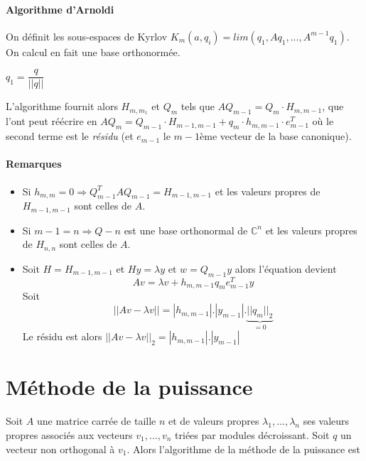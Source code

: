 \documentclass{article}
\begin{document}
\paragraph{Algorithme d'Arnoldi}
On définit les sous-espaces de Kyrlov $K_m(a,q_i) = lim(q_1, Aq_1,...,A^{m-1}q_1)$. On calcul en fait une base orthonormée.

\begin{algorithm}[H]
$q_1 = \dfrac{q}{||q||}$ \\
\end{algorithm}

L'algorithme fournit alors $H_{m,m_1}$ et $Q_m$ tels que $AQ_{m-1}=Q_{m}\cdot H_{m,m-1}$, que l'ont peut réécrire en $AQ_m = Q_{m-1}\cdot H_{m-1,m-1}+q_m\cdot h_{m,m-1} \cdot e_{m-1}^T$ où le second terme est le \emph{résidu} (et $e_{m-1}$ le $m-1$ème vecteur de la base canonique).

\paragraph{Remarques}
\begin{itemize}
\item Si $h_{m,m} = 0 \Rightarrow Q_{m-1}^TAQ_{m-1}=H_{m-1,m-1}$ et les valeurs propres de $H_{m-1,m-1}$ sont celles de $A$.

\item Si $m-1=n \Rightarrow Q-n$ est une base orthonormal de $\mathbb{C}^n$ et les valeurs propres de $H_{n,n}$ sont celles de $A$.

\item Soit $H=H_{m-1,m-1}$ et $Hy=\lambda y$ et $w=Q_{m-1}y$ alors l'équation devient
\[Av=\lambda v + h_{m, m-1}q_m e_{m-1}^T y\]
Soit
\[||Av-\lambda v|| = |h_{m,m-1}|.|y_{m-1}|.\underbrace{||q_m||_2}_{=0}\]
Le résidu est alors $||Av-\lambda v||_2 = |h_{m,m-1}|.|y_{m-1}|$
\end{itemize}


\section{Méthode de la puissance}

Soit $A$ une matrice carrée de taille $n$ et de valeurs propres $\lambda_1,...,\lambda_n$ ses valeurs propres associés aux vecteurs $v_1,...,v_n$ triées par modules décroissant. Soit $q$ un vecteur non orthogonal à $v_1$. Alors l'algorithme de la méthode de la puissance est
\end{document}
